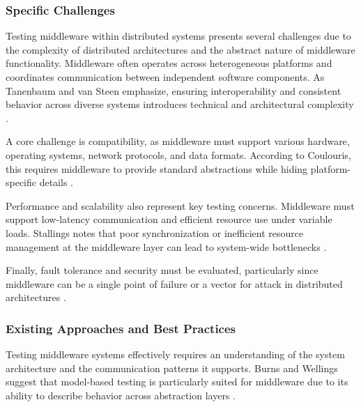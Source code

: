 \subsubsection{Specific Challenges}

Testing middleware within distributed systems presents several challenges due to the complexity of distributed architectures and the abstract nature of middleware functionality. Middleware often operates across heterogeneous platforms and coordinates communication between independent software components. As Tanenbaum and van Steen emphasize, ensuring interoperability and consistent behavior across diverse systems introduces technical and architectural complexity \cite{tanenbaum2017}.

\newpage
A core challenge is compatibility, as middleware must support various hardware, operating systems, network protocols, and data formats. According to Coulouris, this requires middleware to provide standard abstractions while hiding platform-specific details \cite{coulouris2012}. 

\vspace{1em}
Performance and scalability also represent key testing concerns. Middleware must support low-latency communication and efficient resource use under variable loads. Stallings notes that poor synchronization or inefficient resource management at the middleware layer can lead to system-wide bottlenecks \cite{stallings2018}.

\vspace{1em}
Finally, fault tolerance and security must be evaluated, particularly since middleware can be a single point of failure or a vector for attack in distributed architectures \cite{liu2009middleware}.

\subsubsection{Existing Approaches and Best Practices}

Testing middleware systems effectively requires an understanding of the system architecture and the communication patterns it supports. Burns and Wellings suggest that model-based testing is particularly suited for middleware due to its ability to describe behavior across abstraction layers \cite{burns2009real}.


